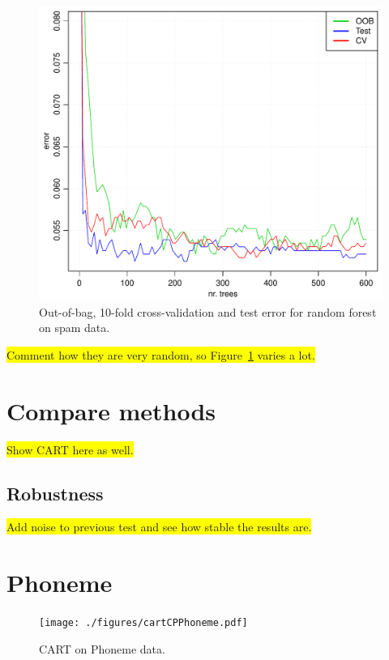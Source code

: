 \begin{figure}[h!]
\begin{center}
    \includegraphics[scale=0.5]{./figures/OOBvsTestvsCV.pdf}
\end{center}
\caption{Out-of-bag, 10-fold cross-validation and test error for random forest on spam data.}
\label{fig:OOBvsTestvsCV}
\end{figure}
\colorbox{yellow}{Comment how they are very random, so Figure~\ref{fig:OOBvsTestvsCV} varies a lot.}\\






\section{Compare methods}
\label{sec:Compare methods}
\colorbox{yellow}{Show CART here as well.}

\subsection{Robustness}
\label{sub:Robustness}

\colorbox{yellow}{Add noise to previous test and see how stable the results are.}
\section{Phoneme}
\label{sec:Phoneme}
\begin{figure}[h!]
\begin{center}
    \texttt{[image: ./figures/cartCPPhoneme.pdf]}
\end{center}
\caption{CART on Phoneme data.}
\label{fig:cartCPPhoneme}
\end{figure}


